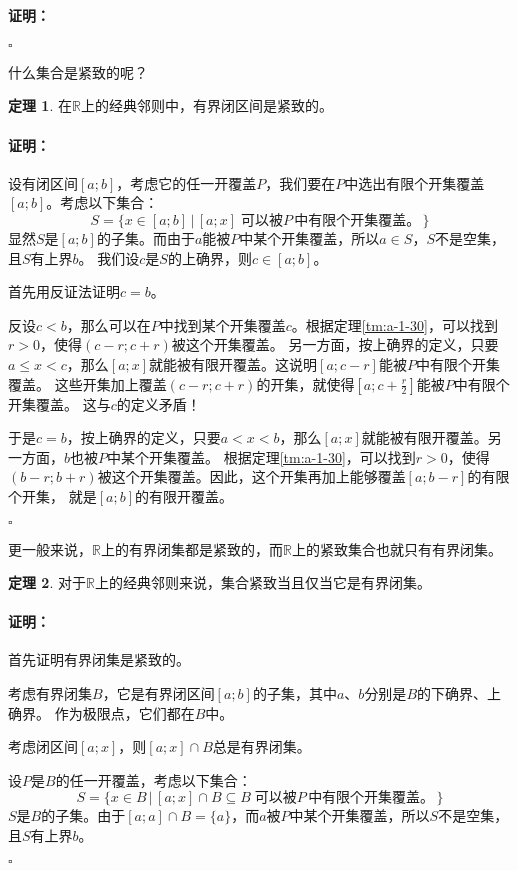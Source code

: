 \documentclass[12pt,UTF8]{ctexbook}
\theoremstyle{definition}
\newtheorem{tm}{定理}[section]
\theoremstyle{plain}
\renewenvironment{proof}{\paragraph{\textbf{证明：}}}{\hfill$\square$}
\begin{document}
\begin{appendix}
\begin{proof}
\end{proof}

什么集合是紧致的呢？

\begin{tm}\label{tm:a-3-10}
    在$\mathbb{R}$上的经典邻则中，有界闭区间是紧致的。
\end{tm}

\begin{proof}
    设有闭区间$[a;b]$，考虑它的任一开覆盖$P$，我们要在$P$中选出有限个开集覆盖$[a;b]$。考虑以下集合：
    $$ S = \{ x\in[a;b] \, | \, [a;x] \; \mbox{可以被}P\,\mbox{中有限个开集覆盖。} \, \} $$
    显然$S$是$[a;b]$的子集。而由于$a$能被$P$中某个开集覆盖，所以$a\in S$，$S$不是空集，且$S$有上界$b$。
    我们设$c$是$S$的上确界，则$c\in[a;b]$。

    首先用反证法证明$c=b$。

    反设$c < b$，那么可以在$P$中找到某个开集覆盖$c$。根据定理\ref{tm:a-1-30}，可以找到$r>0$，使得$(c-r;c+r)$被这个开集覆盖。
    另一方面，按上确界的定义，只要$a\leqslant x<c$，那么$[a;x]$就能被有限开覆盖。这说明$[a;c-r]$能被$P$中有限个开集覆盖。
    这些开集加上覆盖$(c-r;c+r)$的开集，就使得$\displaystyle\left[a;c+\frac{r}{2}\right]$能被$P$中有限个开集覆盖。
    这与$c$的定义矛盾！

    于是$c=b$，按上确界的定义，只要$a<x<b$，那么$[a;x]$就能被有限开覆盖。另一方面，$b$也被$P$中某个开集覆盖。
    根据定理\ref{tm:a-1-30}，可以找到$r>0$，使得$(b-r;b+r)$被这个开集覆盖。因此，这个开集再加上能够覆盖$[a;b-r]$的有限个开集，
    就是$[a;b]$的有限开覆盖。

\end{proof}

更一般来说，$\mathbb{R}$上的有界闭集都是紧致的，而$\mathbb{R}$上的紧致集合也就只有有界闭集。

\begin{tm}
    对于$\mathbb{R}$上的经典邻则来说，集合紧致当且仅当它是有界闭集。
\end{tm}

\begin{proof}
    首先证明有界闭集是紧致的。
    
    考虑有界闭集$B$，它是有界闭区间$[a;b]$的子集，其中$a$、$b$分别是$B$的下确界、上确界。
    作为极限点，它们都在$B$中。
    
    考虑闭区间$[a;x]$，则$[a;x]\cap B$总是有界闭集。
    
    设$P$是$B$的任一开覆盖，考虑以下集合：
    $$ S = \{ x\in B \, | \, [a;x]\cap B \subseteq B \; \mbox{可以被}P\,\mbox{中有限个开集覆盖。} \, \} $$
    $S$是$B$的子集。由于$[a;a]\cap B = \{a\}$，而$a$被$P$中某个开集覆盖，所以$S$不是空集，且$S$有上界$b$。
    

\end{proof}
\end{appendix}
\end{document}
